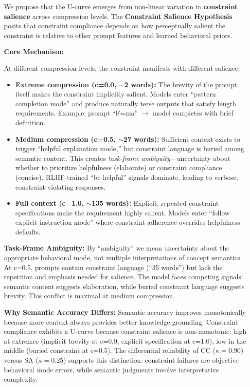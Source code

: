 \documentclass[11pt]{article}
\begin{document}
We propose that the U-curve emerges from non-linear variation in \textbf{constraint salience} across compression levels. The \textbf{Constraint Salience Hypothesis} posits that constraint compliance depends on how perceptually salient the constraint is relative to other prompt features and learned behavioral priors.

\textbf{Core Mechanism:}

At different compression levels, the constraint manifests with different salience:

\begin{itemize}
\item \textbf{Extreme compression (c=0.0, $\sim$2 words):} The brevity of the prompt itself makes the constraint implicitly salient. Models enter ``pattern completion mode'' and produce naturally terse outputs that satisfy length requirements. Example: prompt ``F=ma'' $\rightarrow$ model completes with brief definition.

\item \textbf{Medium compression (c=0.5, $\sim$27 words):} Sufficient context exists to trigger ``helpful explanation mode,'' but constraint language is buried among semantic content. This creates \textit{task-frame ambiguity}---uncertainty about whether to prioritize helpfulness (elaborate) or constraint compliance (concise). RLHF-trained ``be helpful'' signals dominate, leading to verbose, constraint-violating responses.

\item \textbf{Full context (c=1.0, $\sim$135 words):} Explicit, repeated constraint specifications make the requirement highly salient. Models enter ``follow explicit instruction mode'' where constraint adherence overrides helpfulness defaults.
\end{itemize}

\textbf{Task-Frame Ambiguity:} By ``ambiguity'' we mean uncertainty about the appropriate behavioral mode, not multiple interpretations of concept semantics. At c=0.5, prompts contain constraint language (``35 words'') but lack the repetition and emphasis needed for salience. The model faces competing signals: semantic content suggests elaboration, while buried constraint language suggests brevity. This conflict is maximal at medium compression.

\textbf{Why Semantic Accuracy Differs:} Semantic accuracy improves monotonically because more context always provides better knowledge grounding. Constraint compliance exhibits a U-curve because constraint salience is non-monotonic: high at extremes (implicit brevity at c=0.0, explicit specification at c=1.0), low in the middle (buried constraint at c=0.5). The differential reliability of CC ($\kappa = 0.90$) versus SA ($\kappa = 0.25$) supports this distinction: constraint failures are objective behavioral mode errors, while semantic judgments involve interpretative complexity.
\end{document}
